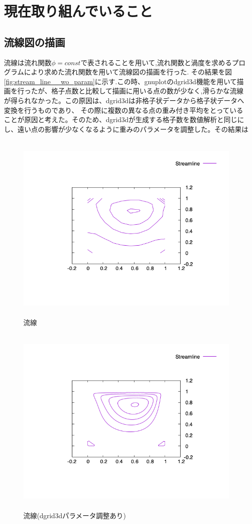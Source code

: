 \documentclass[upLaTeX,a4paper]{jsarticle}
\begin{document}
\section{現在取り組んでいること}
\subsection*{流線図の描画}
流線は流れ関数$\phi = const$で表されることを用いて,流れ関数と渦度を求めるプログラムにより求めた流れ関数を用いて流線図の描画を行った.
その結果を図\ref{fig:stream_line__wo_param}に示す.この時、gnuplotのdgrid3d機能を用いて描画を行ったが、格子点数と比較して描画に用いる点の数が少なく,滑らかな流線が得られなかった。この原因は、dgrid3dは非格子状データから格子状データへ変換を行うものであり、
その際に複数の異なる点の重み付き平均をとっていることが原因と考えた。そのため、dgrid3dが生成する格子数を数値解析と同じにし、遠い点の影響が少なくなるように重みのパラメータを調整した。その結果は
\begin{figure}[H]
  \centering
  \includegraphics[height=9.5cm]{outputs/img/stream_line_wo_param.png}
  \caption{流線}
  \label{fig:stream_line_wo_param}
\end{figure}
\begin{figure}[H]
  \centering
  \includegraphics[height=9.5cm]{outputs/img/stream_line.png}
  \caption{流線(dgrid3dパラメータ調整あり)}
  \label{fig:stream_line}
\end{figure}
\end{document}
